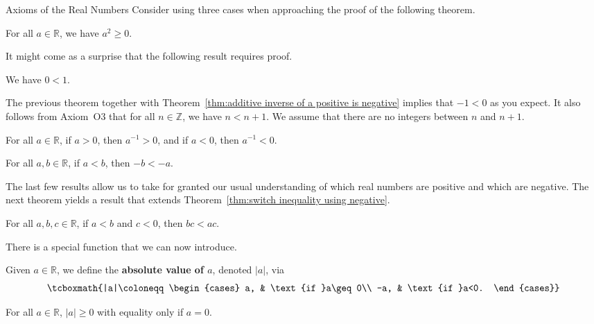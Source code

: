 \begin{section}{Axioms of the Real Numbers}
Consider using three cases when approaching the proof of the following theorem.

\begin{theorem}
For all $a\in\mathbb{R}$, we have $a^2\geq 0$.
\end{theorem}

It might come as a surprise that the following result requires proof.

\begin{theorem}\label{thm:0<1}
We have $0<1$.
\end{theorem}

The previous theorem together with Theorem~\ref{thm:additive inverse of a positive is negative} implies that $-1<0$ as you expect. It also follows from Axiom~O3 that for all $n\in\mathbb{Z}$, we have $n<n+1$. We assume that there are no integers between $n$ and $n+1$.

\begin{theorem}
For all $a\in\mathbb{R}$, if $a>0$, then $a^{-1}>0$, and if $a<0$, then $a^{-1}<0$.
\end{theorem}

\begin{theorem}\label{thm:switch inequality using negative}
For all $a,b\in \mathbb{R}$, if $a<b$, then $-b<-a$. 
\end{theorem}

The last few results allow us to take for granted our usual understanding of which real numbers are positive and which are negative. The next theorem yields a result that extends Theorem~\ref{thm:switch inequality using negative}.

\begin{theorem}
For all $a,b,c\in \mathbb{R}$, if $a<b$ and $c<0$, then $bc<ac$. 
\end{theorem}

There is a special function that we can now introduce. 

\begin{definition}
Given $a\in\mathbb{R}$, we define the \textbf{absolute value of $a$}, denoted $|a|$, via
\[
\tcboxmath{|a|\coloneqq \begin{cases}
a, & \text{if }a\geq 0\\
-a, & \text{if }a<0.
\end{cases}}
\]
\end{definition}

\begin{theorem}
For all $a\in\mathbb{R}$, $|a|\geq 0$ with equality only if $a=0$.
\end{theorem}


\end{section}
